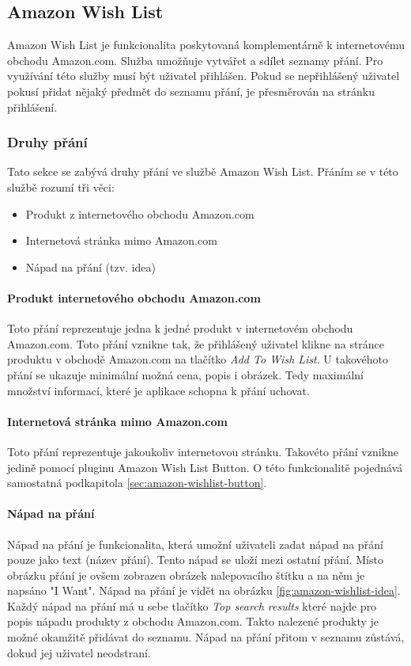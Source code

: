 \subsection{Amazon Wish List}
Amazon Wish List je funkcionalita poskytovaná komplementárně k internetovému obchodu Amazon.com. Služba umožňuje vytvářet a sdílet seznamy přání. Pro využívání této služby musí být uživatel přihlášen. Pokud se nepřihlášený uživatel pokusí přidat nějaký předmět do seznamu přání, je přesměrován na stránku přihlášení.

\subsubsection{Druhy přání}
Tato sekce se zabývá druhy přání ve službě Amazon Wish List. Přáním se v této službě rozumí tři věci:
\begin{itemize}
\item Produkt z internetového obchodu Amazon.com
\item Internetová stránka mimo Amazon.com
\item Nápad na přání (tzv. idea)
\end{itemize}

\paragraph{Produkt internetového obchodu Amazon.com}
\label{par:produkt-amazon}
Toto přání reprezentuje jedna k jedné produkt v internetovém obchodu Amazon.com. Toto přání vznikne tak, že přihlášený uživatel klikne na stránce produktu v obchodě Amazon.com na tlačítko \emph{Add To Wish List}. U takovéhoto přání se ukazuje minimální možná cena, popis i obrázek. Tedy maximální množství informací, které je aplikace schopna k přání uchovat.

\paragraph{Internetová stránka mimo Amazon.com}
Toto přání reprezentuje jakoukoliv internetovou stránku. Takovéto přání vznikne jedině pomocí pluginu Amazon Wish List Button. O této funkcionalitě pojednává samostatná podkapitola \ref{sec:amazon-wishlist-button}.

\paragraph{Nápad na přání}
Nápad na přání je funkcionalita, která umožní uživateli zadat nápad na přání pouze jako text (název přání). Tento nápad se uloží mezi ostatní přání. Místo obrázku přání je ovšem zobrazen obrázek nalepovacího štítku a na něm je napsáno "I Want". Nápad na přání je vidět na obrázku \ref{fig:amazon-wishlist-idea}. Každý nápad na přání má u sebe tlačítko \emph{Top search results} které najde pro popis nápadu produkty z obchodu Amazon.com. Takto nalezené produkty je možné okamžitě přidávat do seznamu. Nápad na přání přitom v seznamu zůstává, dokud jej uživatel neodstraní.

